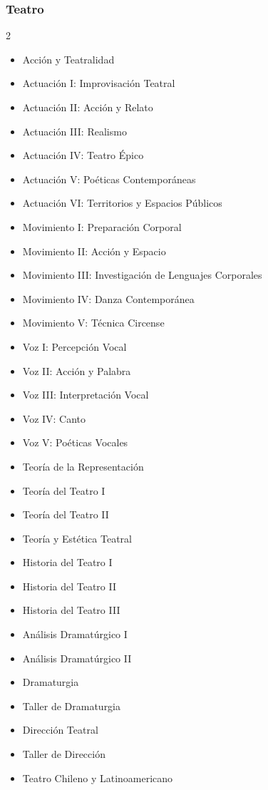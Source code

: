 \documentclass[12pt,a4paper]{article}
\begin{document}
	\subsubsection{Teatro}
	\begin{multicols}{2}
		\begin{itemize}
			\item Acción y Teatralidad
			\item Actuación I: Improvisación Teatral
			\item Actuación II: Acción y Relato
			\item Actuación III: Realismo
			\item Actuación IV: Teatro Épico
			\item Actuación V: Poéticas Contemporáneas
			\item Actuación VI: Territorios y Espacios Públicos
			\item Movimiento I: Preparación Corporal
			\item Movimiento II: Acción y Espacio
			\item Movimiento III: Investigación de Lenguajes Corporales
			\item Movimiento IV: Danza Contemporánea
			\item Movimiento V: Técnica Circense
			\item Voz I: Percepción Vocal
			\item Voz II: Acción y Palabra
			\item Voz III: Interpretación Vocal
			\item Voz IV: Canto
			\item Voz V: Poéticas Vocales
			\item Teoría de la Representación
			\item Teoría del Teatro I
			\item Teoría del Teatro II
			\item Teoría y Estética Teatral
			\item Historia del Teatro I
			\item Historia del Teatro II
			\item Historia del Teatro III
			\item Análisis Dramatúrgico I
			\item Análisis Dramatúrgico II
			\item Dramaturgia
			\item Taller de Dramaturgia
			\item Dirección Teatral
			\item Taller de Dirección
			\item Teatro Chileno y Latinoamericano
		\end{itemize}
	\end{multicols}
	
\end{document}
